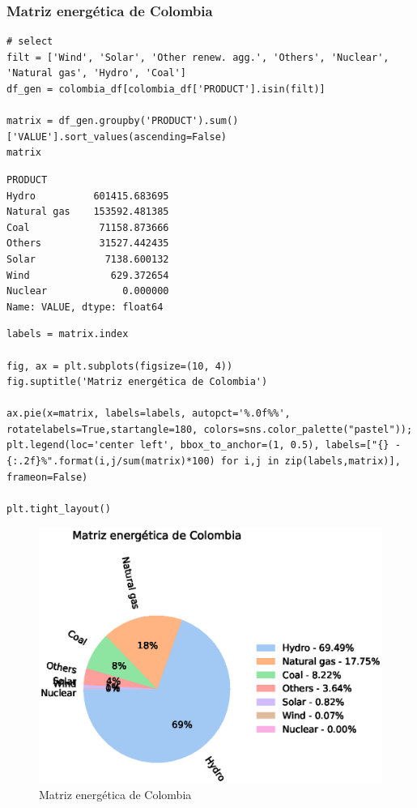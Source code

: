 \documentclass{article}
\begin{document}
\subsubsection{Matriz energética de Colombia}

\begin{verbatim}
# select 
filt = ['Wind', 'Solar', 'Other renew. agg.', 'Others', 'Nuclear', 'Natural gas', 'Hydro', 'Coal']
df_gen = colombia_df[colombia_df['PRODUCT'].isin(filt)]

matrix = df_gen.groupby('PRODUCT').sum()['VALUE'].sort_values(ascending=False)
matrix
\end{verbatim}

\begin{verbatim}
PRODUCT
Hydro          601415.683695
Natural gas    153592.481385
Coal            71158.873666
Others          31527.442435
Solar            7138.600132
Wind              629.372654
Nuclear             0.000000
Name: VALUE, dtype: float64
\end{verbatim}

\begin{verbatim}
labels = matrix.index

fig, ax = plt.subplots(figsize=(10, 4))
fig.suptitle('Matriz energética de Colombia')

ax.pie(x=matrix, labels=labels, autopct='%.0f%%', rotatelabels=True,startangle=180, colors=sns.color_palette("pastel"));
plt.legend(loc='center left', bbox_to_anchor=(1, 0.5), labels=["{} - {:.2f}%".format(i,j/sum(matrix)*100) for i,j in zip(labels,matrix)], frameon=False)

plt.tight_layout()
\end{verbatim}

\begin{figure}[t]
	\centering
	\includegraphics[width=1\linewidth]{fig_6}
	\caption{Matriz energética de Colombia}
	\label{fig:fig6}
\end{figure}
\end{document}
